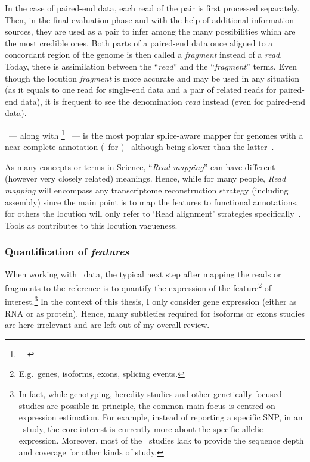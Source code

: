 In the case of paired-end data, each read of the pair is first processed
separately.
Then, in the final evaluation phase and
with the help of additional information sources,
they are used as a pair to infer among the many possibilities which
are the most credible ones.
Both parts of a paired-end data once aligned to a
concordant region of the genome is then called a \emph{fragment} instead of a
\emph{read}. Today, there is assimilation between the \enquote{\emph{read}}
and the \enquote{\emph{fragment}} terms. Even though the locution \emph{fragment}
is more accurate and may be used in any situation (as it equals to one read for
single-end data and a pair of related reads for paired-end data), it is
frequent to see the denomination \emph{read} instead (even for paired-end data).

\toph\ ---
along with \footnote{ ---
}~ ---
is the most popular splice-aware mapper for genomes with a near-complete annotation
(\eg\ for )~
although being slower than the latter~.



As many concepts or terms in Science, \enquote{\emph{Read mapping}} can
have different (however very closely related) meanings.
Hence, while for many people, \emph{Read mapping} will encompass any
transcriptome reconstruction strategy (including  assembly) since
the main point is to map the features to functional annotations,
for others the locution will only refer to
`Read alignment' strategies specifically~.
Tools as  contributes to this locution vagueness.

\subsubsection{Quantification of \emph{features}}\label{subsubsec:rnaseqQuant}

When working with \Rnaseq\ data, the typical next step after mapping the reads or
fragments to the reference is to quantify the expression of the
feature\footnote{E.g.\ genes, isoforms, exons, splicing events.}
of interest.\footnote{In fact, while genotyping, heredity
studies and other genetically focused studies are possible in principle, the common
main focus is centred on expression estimation. For example, instead of
reporting a specific \gls{SNP}, in an \Rnaseq\ study, the core interest is
currently more about the specific allelic expression. Moreover, most of the \Rnaseq\
studies lack to provide the sequence depth and coverage for other kinds of study.}
In the context of this thesis, I only consider gene expression (either as \gls{RNA}
or as protein). Hence, many subtleties required for isoforms or exons studies are
here irrelevant and are left out of my overall review.

